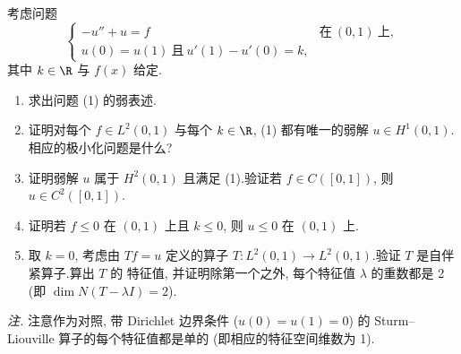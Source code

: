 \begin{exercise}
\label{exer:8.34}
考虑问题
\begin{equation}
\begin{cases}
-u''+u=f & \text{在}\ (0,1)\ \text{上},\\
u(0)=u(1)\ \text{且}\ u'(1)-u'(0)=k,
\end{cases}
\tag{1}
\end{equation}
其中 $k\in\R$ 与 $f(x)$ 给定.
\begin{enumerate}[label=\arabic*., leftmargin=2.2em, itemsep=0.3em]
	\item 求出问题 (1) 的弱表述.
	\item 证明对每个 $f\in L^2(0,1)$ 与每个 $k\in\R$, (1) 都有唯一的弱解
	      $u\in H^1(0,1)$.相应的极小化问题是什么?
	\item 证明弱解 $u$ 属于 $H^2(0,1)$ 且满足 (1).验证若
	      $f\in C([0,1])$, 则 $u\in C^2([0,1])$.
	\item 证明若 $f\le0$ 在 $(0,1)$ 上且 $k\le0$, 则 $u\le0$ 在 $(0,1)$ 上.
	\item 取 $k=0$, 考虑由 $Tf=u$ 定义的算子
	      $T:L^2(0,1)\to L^2(0,1)$.验证 $T$ 是自伴紧算子.算出 $T$ 的
	      特征值, 并证明除第一个之外, 每个特征值 $\lambda$ 的重数都是 2
	      (即 $\dim N(T-\lambda I)=2$).
\end{enumerate}
\emph{注.} 注意作为对照, 带 Dirichlet 边界条件 ($u(0)=u(1)=0$) 的
Sturm--Liouville 算子的每个特征值都是单的 (即相应的特征空间维数为 1).
\end{exercise}


